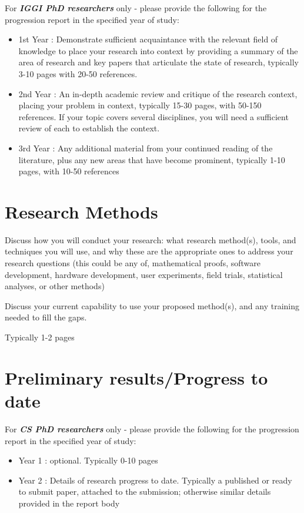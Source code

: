 \documentclass[11pt,a4paper]{article}
\begin{document}
For \textbf{\emph{IGGI PhD researchers}} only - please provide the following for the progression report in the specified year of study:
\begin{itemize}
    \item 1st Year : Demonstrate sufficient acquaintance with the relevant field of knowledge to place your research into context by providing a summary of the area of research and key papers that articulate the state of research, typically 3-10 pages with 20-50 references.
    \item 2nd Year : An in-depth academic review and critique of the research context, placing your problem in context, typically 15-30 pages, with 50-150 references.  If your topic covers several disciplines, you will need a sufficient review of each to establish the context.
    \item 3rd Year : Any additional material from your continued reading of the literature, plus any new areas that have become prominent, typically 1-10 pages, with 10-50 references
\end{itemize}

\section{Research Methods}
Discuss how you will conduct your research: what research method(s), tools, and techniques you will use, and why these are the appropriate ones to address your research questions (this could be any of, mathematical proofs, software development, hardware development, user experiments, field trials, statistical analyses, or other methods)

Discuss your current capability to use your proposed method(s), and any training needed to fill the gaps.

Typically 1-2 pages

\section{Preliminary results/Progress to date}

For \textbf{\emph{CS PhD researchers}} only - please provide the following for the progression report in the specified year of study:
\begin{itemize}
    \item Year 1 : optional. Typically 0-10 pages
    \item Year 2 : Details of research progress to date. Typically a published or ready to submit paper, attached to the submission; otherwise similar details provided in the report body
\end{itemize}
\end{document}
